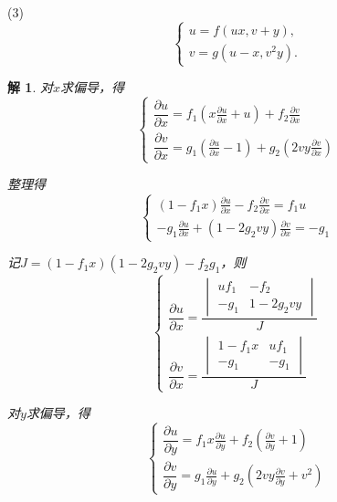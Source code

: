 \documentclass[a4paper,12pt]{article}
\newtheorem*{sol}{解}
\begin{document}
(3)
$$
    \begin{cases}
        u = f(ux, v + y), \\
        v = g(u - x, v^2 y).
    \end{cases}
$$
\begin{sol}
    对$x$求偏导，得
    $$\begin{cases}
            \dfrac{\partial u}{\partial x} = f_1\left(x\frac{\partial u}{\partial x} + u\right) + f_2\frac{\partial v}{\partial x} \\[10pt]
            \dfrac{\partial v}{\partial x} = g_1\left(\frac{\partial u}{\partial x} - 1\right) + g_2\left(2vy\frac{\partial v}{\partial x}\right)
        \end{cases}$$

    整理得
    $$\begin{cases}
            (1 - f_1 x)\frac{\partial u}{\partial x} - f_2\frac{\partial v}{\partial x} = f_1 u \\
            -g_1\frac{\partial u}{\partial x} + (1 - 2g_2 vy)\frac{\partial v}{\partial x} = -g_1
        \end{cases}$$

    记$J = (1 - f_1 x)(1 - 2g_2 vy) - f_2 g_1$，则
    $$\begin{cases}
            \dfrac{\partial u}{\partial x} = \dfrac{\begin{vmatrix}
                                                            uf_1 & -f_2        \\
                                                            -g_1 & 1 - 2g_2 vy
                                                        \end{vmatrix}}{J} \\[15pt]
            \dfrac{\partial v}{\partial x} = \dfrac{\begin{vmatrix}
                                                            1 - f_1 x & uf_1 \\
                                                            -g_1      & -g_1
                                                        \end{vmatrix}}{J}
        \end{cases}$$

    对$y$求偏导，得
    $$\begin{cases}
            \dfrac{\partial u}{\partial y} = f_1 x\frac{\partial u}{\partial y} + f_2\left(\frac{\partial v}{\partial y} + 1\right) \\[10pt]
            \dfrac{\partial v}{\partial y} = g_1\frac{\partial u}{\partial y} + g_2\left(2vy\frac{\partial v}{\partial y} + v^2\right)
        \end{cases}$$


\end{sol}
\end{document}
